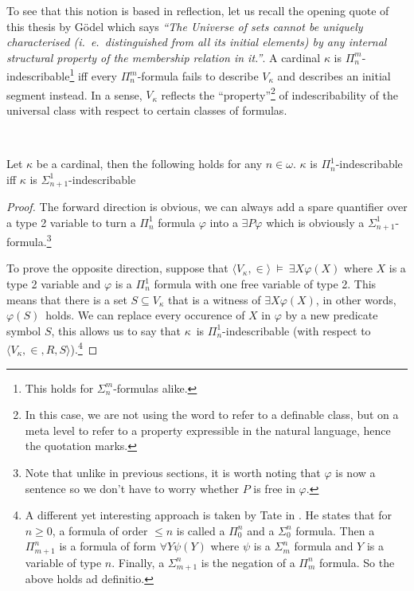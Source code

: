 To see that this notion is based in reflection, let us recall the opening quote of this thesis by Gödel which says \emph{``The Universe of sets cannot be uniquely characterised (i.~e.~distinguished from all its initial elements) by any internal structural property of the membership relation in it.''}. A cardinal $\kappa$ is $\Pi^m_n$-indescribable\footnote{This holds for $\Sigma^m_n$-formulas alike.} iff every $\Pi^m_n$-formula fails to describe $V_\kappa$ and describes an initial segment instead.
In a sense, $V_\kappa$ reflects the ``property''\footnote{In this case, we are not using the word to refer to a definable class, but on a meta level to refer to a property expressible in the natural language, hence the quotation marks.} of indescribability of the universal class with respect to certain classes of formulas.

\


\begin{lemma}
Let $\kappa$ be a cardinal, then the following holds for any $n \in \omega$. $\kappa$ is $\Pi^1_n$-indescribable iff $\kappa$ is $\Sigma^1_{n+1}$-indescribable
\end{lemma}

\begin{proof}
The forward direction is obvious, we can always add a spare quantifier over a type 2 variable to turn a $\Pi^1_n$ formula $\varphi$ into a $\exists P \varphi$ which is obviously a $\Sigma^1_{n+1}$-formula.\footnote{Note that unlike in previous sections, it is worth noting that $\varphi$ is now a sentence so we don't have to worry whether $P$ is free in $\varphi$.}

To prove the opposite direction, suppose that $\langle V_\kappa, \in \rangle~\models~\exists X \varphi(X)$ where $X$ is a type 2 variable and $\varphi$ is a $\Pi^1_n$ formula with one free variable of type 2. 
This means that there is a set $S \subseteq V_\kappa$ that is a witness of $\exists X \varphi(X)$, in other words, $\varphi(S)$ holds. 
We can replace every occurence of $X$ in $\varphi$ by a new predicate symbol $S$, this allows us to say that $\kappa$ is $\Pi^1_n$-indescribable (with respect to $\langle V_\kappa, \in, R, S \rangle$).\footnote{A different yet interesting approach is taken by Tate in \cite{Tait_constructingcardinals}. He states that for $n\geq 0$, a formula of order $\leq n$ is called a $\Pi^n_0$ and a $\Sigma^n_0$ formula. Then a $\Pi^n_{m+1}$ is a formula of form $\forall Y \psi(Y)$ where $\psi$ is a $\Sigma^n_m$ formula and $Y$ is a variable of type $n$. Finally, a $\Sigma^n_{m+1}$ is the negation of a $\Pi^n_m$ formula. So the above holds ad definitio.}
\end{proof}

